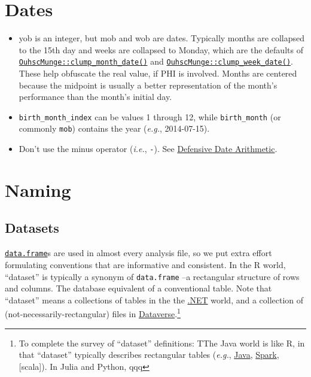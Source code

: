 \documentclass[
]{book}
\begin{document}
\hypertarget{style-dates}{%
\section{Dates}\label{style-dates}}

\begin{itemize}
\item
  yob is an integer, but mob and wob are dates. Typically months are collapsed to the 15th day and weeks are collapsed to Monday, which are the defaults of \href{http://ouhscbbmc.github.io/OuhscMunge/reference/clump_date.html}{\texttt{OuhscMunge::clump\_month\_date()}} and \href{http://ouhscbbmc.github.io/OuhscMunge/reference/clump_date.html}{\texttt{OuhscMunge::clump\_week\_date()}}. These help obfuscate the real value, if PHI is involved. Months are centered because the midpoint is usually a better representation of the month's performance than the month's initial day.
\item
  \texttt{birth\_month\_index} can be values 1 through 12, while \texttt{birth\_month} (or commonly \texttt{mob}) contains the year (\emph{e.g.}, 2014-07-15).
\item
  Don't use the minus operator (\emph{i.e.}, \texttt{-}). See \protect\hyperlink{coding-defensive-date-arithmetic}{Defensive Date Arithmetic}.
\end{itemize}

\hypertarget{naming}{%
\section{Naming}\label{naming}}

\hypertarget{style-naming-datasets}{%
\subsection{Datasets}\label{style-naming-datasets}}

\href{https://stat.ethz.ch/R-manual/R-devel/library/base/html/data.frame.html}{\texttt{data.frame}}s are used in almost every analysis file, so we put extra effort formulating conventions that are informative and consistent. In the R world, ``dataset'' is typically a synonym of \texttt{data.frame} --a rectangular structure of rows and columns. The database equivalent of a conventional table. Note that ``dataset'' means a collections of tables in the the \href{https://docs.microsoft.com/en-us/dotnet/framework/data/adonet/dataset-datatable-dataview/}{.NET} world, and a collection of (not-necessarily-rectangular) files in \href{https://dataverse.harvard.edu}{Dataverse}.\footnote{To complete the survey of ``dataset'' definitions: TThe Java world is like R, in that ``dataset'' typically describes rectangular tables (\emph{e.g.}, \href{https://docs.oracle.com/cd/E17802_01/j2se/javase/6/jcp/beta/apidiffs/java/sql/DataSet.html}{Java}, \href{https://spark.apache.org/docs/latest/api/java/org/apache/spark/sql/Dataset.html}{Spark}, {[}scala{]}). In Julia and Python, qqq}
\end{document}
